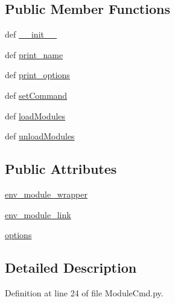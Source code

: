 \subsection*{Public Member Functions}
\begin{DoxyCompactItemize}
\item 
def \hyperlink{classModuleCmd_1_1ModuleCmd_afc2639b024f0254c9a1e4db7c0e890cf}{\-\_\-\-\_\-init\-\_\-\-\_\-}
\item 
def \hyperlink{classModuleCmd_1_1ModuleCmd_ae44917ee5bdcc85a4b1675f82a2f03b3}{print\-\_\-name}
\item 
def \hyperlink{classModuleCmd_1_1ModuleCmd_a731bb50ac44c88e49675b9790740a9af}{print\-\_\-options}
\item 
def \hyperlink{classModuleCmd_1_1ModuleCmd_aafcfb3f7b8d445df29c888c938c932fd}{set\-Command}
\item 
def \hyperlink{classModuleCmd_1_1ModuleCmd_acb50720c70196a40e3bde85f79fea3cb}{load\-Modules}
\item 
def \hyperlink{classModuleCmd_1_1ModuleCmd_a93a6a59db499c50ffb9ffe8e043a4733}{unload\-Modules}
\end{DoxyCompactItemize}
\subsection*{Public Attributes}
\begin{DoxyCompactItemize}
\item 
\hyperlink{classModuleCmd_1_1ModuleCmd_ae60edec82191b5a7a1830495b1ca2e3e}{env\-\_\-module\-\_\-wrapper}
\item 
\hyperlink{classModuleCmd_1_1ModuleCmd_a1b4a34e278600fe59cd55bb0d56baa61}{env\-\_\-module\-\_\-link}
\item 
\hyperlink{classModuleCmd_1_1ModuleCmd_a981a0fc879a722b76faa16b4289ab953}{options}
\end{DoxyCompactItemize}


\subsection{Detailed Description}


Definition at line 24 of file Module\-Cmd.\-py.



